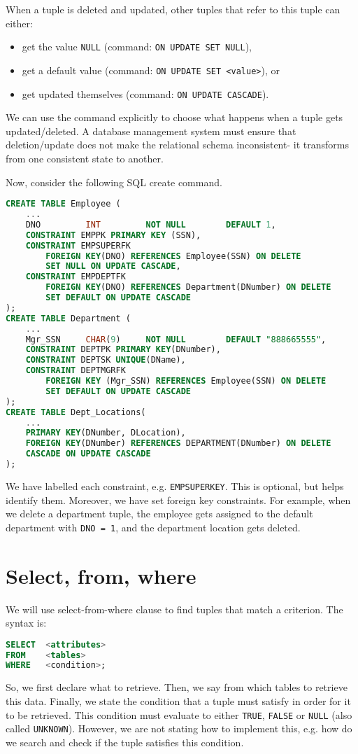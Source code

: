 \documentclass[a4paper, openany]{memoir}
\begin{document}
When a tuple is deleted and updated, other tuples that refer to this tuple can either:
\begin{itemize}
    \item get the value \texttt{NULL} (command: \texttt{ON UPDATE SET NULL}),
    \item get a default value (command: \texttt{ON UPDATE SET <value>}), or
    \item get updated themselves (command: \texttt{ON UPDATE CASCADE}).
\end{itemize}
We can use the command explicitly to choose what happens when a tuple gets updated/deleted. A database management system must ensure that deletion/update does not make the relational schema inconsistent- it transforms from one consistent state to another.

Now, consider the following SQL create command.
\begin{lstlisting}[language=SQL]
CREATE TABLE Employee (
    ...
    DNO         INT         NOT NULL        DEFAULT 1,
    CONSTRAINT EMPPK PRIMARY KEY (SSN),
    CONSTRAINT EMPSUPERFK 
        FOREIGN KEY(DNO) REFERENCES Employee(SSN) ON DELETE 
        SET NULL ON UPDATE CASCADE,
    CONSTRAINT EMPDEPTFK
        FOREIGN KEY(DNO) REFERENCES Department(DNumber) ON DELETE
        SET DEFAULT ON UPDATE CASCADE
);
CREATE TABLE Department (
    ...
    Mgr_SSN     CHAR(9)     NOT NULL        DEFAULT "888665555",
    CONSTRAINT DEPTPK PRIMARY KEY(DNumber),
    CONSTRAINT DEPTSK UNIQUE(DName),
    CONSTRAINT DEPTMGRFK
        FOREIGN KEY (Mgr_SSN) REFERENCES Employee(SSN) ON DELETE
        SET DEFAULT ON UPDATE CASCADE
);
CREATE TABLE Dept_Locations(
    ...
    PRIMARY KEY(DNumber, DLocation),
    FOREIGN KEY(DNumber) REFERENCES DEPARTMENT(DNumber) ON DELETE 
    CASCADE ON UPDATE CASCADE
);
\end{lstlisting}
We have labelled each constraint, e.g. \texttt{EMPSUPERKEY}. This is optional, but helps identify them. Moreover, we have set foreign key constraints. For example, when we delete a department tuple, the employee gets assigned to the default department with \texttt{DNO = 1}, and the department location gets deleted.
\newpage

\section{Select, from, where}
We will use select-from-where clause to find tuples that match a criterion. The syntax is:
\begin{lstlisting}[language=SQL]
SELECT  <attributes>
FROM    <tables>
WHERE   <condition>;
\end{lstlisting}
So, we first declare what to retrieve. Then, we say from which tables to retrieve this data. Finally, we state the condition that a tuple must satisfy in order for it to be retrieved. This condition must evaluate to either \texttt{TRUE}, \texttt{FALSE} or \texttt{NULL} (also called \texttt{UNKNOWN}). However, we are not stating how to implement this, e.g. how do we search and check if the tuple satisfies this condition.
\end{document}

